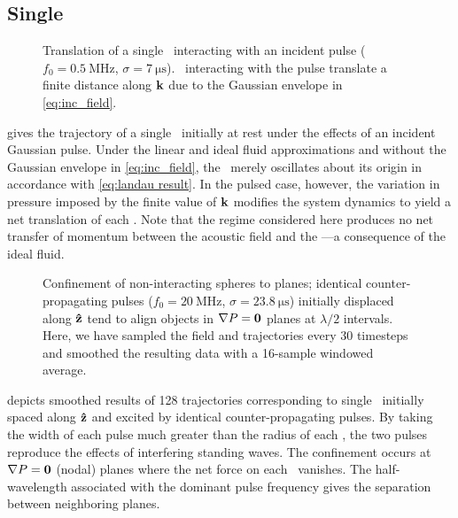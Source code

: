 \subsection{Single \bubbles}

\begin{figure}
  \centering
  \caption{\label{fig:single_displacement}Translation of a single \bubble\ interacting with an incident pulse ($f_0 = \SI{0.5}{\mega\hertz}$, $\sigma = \SI{7}{\micro\second}$). \Bubbles\ interacting with the pulse translate a finite distance along $\vb{k}$ due to the Gaussian envelope in \cref{eq:inc_field}.}
\end{figure}

 gives the trajectory of a single \bubble\ initially at rest under the effects of an incident Gaussian pulse.
Under the linear and ideal fluid approximations and without the Gaussian envelope in \cref{eq:inc_field}, the \bubble\ merely oscillates about its origin in accordance with \cref{eq:landau result}.
In the pulsed case, however, the variation in pressure imposed by the finite value of $\vb{k}$ modifies the system dynamics to yield a net translation of each \bubble.
Note that the regime considered here produces no net transfer of momentum between the acoustic field and the \bubble---a consequence of the ideal fluid.

\begin{figure}
  \centering
  \caption{\label{fig:planar_confinement}
  Confinement of non-interacting spheres to planes; identical counter-propagating pulses ($f_0 = \SI{20}{\mega\hertz}$, $\sigma = \SI{23.8}{\micro\second}$) initially displaced along $\vu{z}$ tend to align objects in $\nabla P = \vb{0}$ planes at $\lambda/2$ intervals.
    Here, we have sampled the field and trajectories every 30 timesteps and smoothed the resulting data with a 16-sample windowed average.
  }
\end{figure}

 depicts smoothed results of 128 trajectories corresponding to single \bubbles\ initially spaced along $\vu{z}$ and excited by identical counter-propagating pulses.
By taking the width of each pulse much greater than the radius of each \bubble, the two pulses reproduce the effects of interfering standing waves.
The confinement occurs at $\nabla P = \vb{0}$ (nodal) planes where the net force on each \bubble\ vanishes.
The half-wavelength associated with the dominant pulse frequency gives the separation between neighboring planes.

